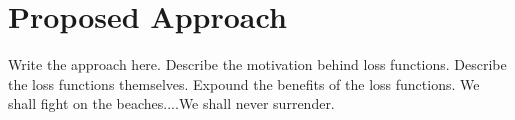 \section{Proposed Approach}

Write the approach here. Describe the motivation behind loss functions. Describe the loss functions
themselves. Expound the benefits of the loss functions. We shall fight on the beaches....We shall
never surrender.
